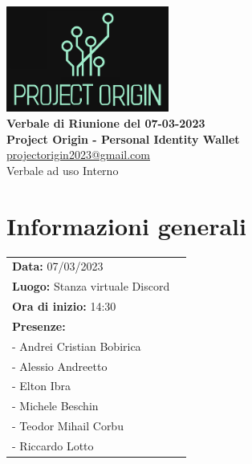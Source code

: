 \documentclass[a4paper,12pt]{article}
\begin{document}
\newcommand{\makefrontpage}{
	\begin{titlepage}
		\begin{center}
		\includegraphics[width=0.4\textwidth]{Project_Origin_full_logo.png}\\

		\vspace{1.5cm}
		{\LARGE \textbf{Verbale di Riunione del 07-03-2023}}
		\\\vspace{0.5cm}
		\textbf{Project Origin - Personal Identity Wallet}
		\\\vspace{0.2cm}		
		\href{mailto://projectorigin2023@gmail.com}{projectorigin2023@gmail.com}
		\\\vspace{0.5cm}
		\large{Verbale ad uso Interno}
		\vfill
		
		
		\vspace{2cm}

		
		\end{center}
	\end{titlepage}
}
\makefrontpage
\section*{Informazioni generali}
\begin{tabular}{ll}%
\textbf{Data:}  07/03/2023 \\
\textbf{Luogo:}  Stanza virtuale Discord \\
\textbf{Ora di inizio:}  14:30 \\
\textbf{Presenze:} \\
					\quad - Andrei Cristian Bobirica\\
					\quad - Alessio Andreetto\\
					\quad - Elton Ibra\\
					\quad - Michele Beschin\\
					\quad - Teodor Mihail Corbu\\
					\quad - Riccardo Lotto
\end{tabular}
\end{document}
